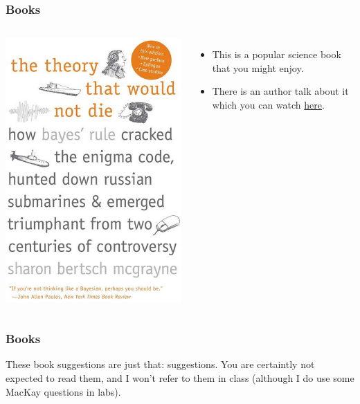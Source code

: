 \documentclass{beamer}
\begin{document}
\begin{frame}
\frametitle{Books}

    \begin{columns} %
        \includegraphics[width=0.7\linewidth]{images/theory.png}

        \begin{itemize}
        \item This is a popular science book that you might enjoy.\pause
        \item There is an author talk about it which you can watch
            \href{https://www.youtube.com/watch?v=8oD6eBkjF9o}{here}.
        \end{itemize}
     \end{columns}

\end{frame}


\begin{frame}
\frametitle{Books}
These book suggestions are just that: suggestions. You are certaintly not
expected to read them, and I won't refer to them in class (although I do use
some MacKay questions in labs).

\end{frame}
\end{document}
